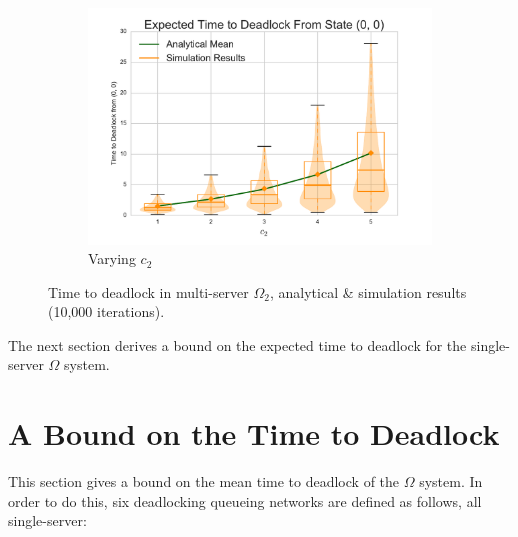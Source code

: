 \documentclass{article}
\numberwithin{equation}{section}
\begin{document}
\begin{figure}[!htbp]
\begin{center}
\begin{subfigure}[b]{0.34\textwidth}
    \includegraphics[width=\textwidth]{images/varyc2_2Nms}
    \caption{Varying $c_2$}
    \label{fig:2Nms_c2}
  \end{subfigure}
  \end{center}
  \caption{Time to deadlock in multi-server $\Omega_2$, analytical \& simulation results (10,000 iterations).}
  \label{fig:timestodeadlock2nodemultiserver}
\end{figure}

The next section derives a bound on the expected time to deadlock for the single-server $\Omega$ system.


\section{A Bound on the Time to Deadlock}\label{sec:bound}

This section gives a bound on the mean time to deadlock of the $\Omega$ system.
In order to do this, six deadlocking queueing networks are defined as follows, all single-server:
\end{document}
